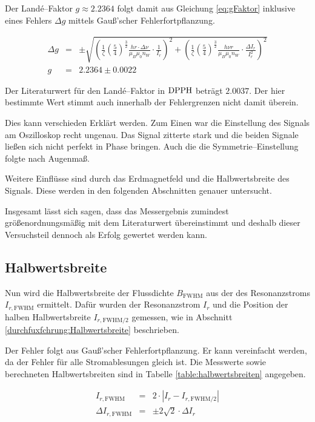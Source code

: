 \documentclass[12pt,a4paper]{scrartcl}
\numberwithin{equation}{section} %
\begin{document}
\noindent
Der Landé--Faktor $g\approx 2.2364$ folgt damit aus Gleichung \eqref{eq:gFaktor} inklusive eines Fehlers $\Delta g$ mittels Gauß'scher Fehlerfortpflanzung.

\begin{eqnarray}
	\Delta g &=&
		\pm\sqrt{
			\left(\frac{1}{\zeta} \left(\frac{5}{4}\right)^{\frac{3}{2}} \frac{h r \cdot \Delta \nu}{\mu_B \mu_0 n_W} \cdot  \frac{1}{I_r}\right)^2 + \left(\frac{1}{\zeta} \left(\frac{5}{4}\right)^{\frac{3}{2}} \frac{h \nu r}{\mu_B \mu_0 n_W} \cdot \frac{\Delta I_r}{I_r^2}\right)^2
		} \\
	g &=& 2.2364 \pm 0.0022
\end{eqnarray}

\noindent
Der Literaturwert für den Landé--Faktor in $\ce{DPPH}$ beträgt $2.0037$. \cite{Uni} Der hier bestimmte Wert stimmt auch innerhalb der Fehlergrenzen nicht damit überein.

Dies kann verschieden Erklärt werden. Zum Einen war die Einstellung des Signals am Oszilloskop recht ungenau. Das Signal zitterte stark und die beiden Signale ließen sich nicht perfekt in Phase bringen. Auch die die Symmetrie--Einstellung folgte nach Augenmaß.

Weitere Einflüsse sind durch das Erdmagnetfeld und die Halbwertsbreite des Signals. Diese werden in den folgenden Abschnitten genauer untersucht.

Insgesamt lässt sich sagen, dass das Messergebnis zumindest größenordnungsmäßig mit dem Literaturwert übereinstimmt und deshalb dieser Versuchsteil dennoch als Erfolg gewertet werden kann.

\subsection{Halbwertsbreite}
\label{auswertung:Halbwertsbreite}

Nun wird die Halbwertsbreite der Flussdichte $B_\mathrm{FWHM}$ aus der des Resonanzstroms $I_{r,\mathrm{FWHM}}$ ermittelt. Dafür wurden der Resonanzstrom $I_r$ und die Position der halben Halbwertsbreite $I_{r,\mathrm{FWHM}/2}$ gemessen, wie in Abschnitt \ref{durchfuxfchrung:Halbwertsbreite} beschrieben.

Der Fehler folgt aus Gauß'scher Fehlerfortpflanzung. Er kann vereinfacht werden, da der Fehler für alle Stromablesungen gleich ist. Die Messwerte sowie berechneten Halbwertsbreiten sind in Tabelle \ref{table:halbwertsbreiten} angegeben.

\begin{eqnarray}
	I_{r,\mathrm{FWHM}} &=& 2\cdot\left|I_r-I_{r,\mathrm{FWHM}/2}\right| \\
	\Delta I_{r,\mathrm{FWHM}} &=& \pm2\sqrt{2} \cdot \Delta I_r
\end{eqnarray}
\end{document}
